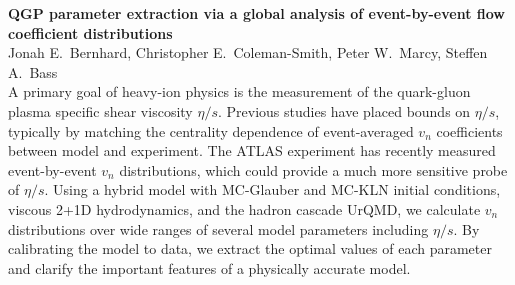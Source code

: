 \documentclass[letterpaper,10pt]{article}
\begin{document}
\textbf{QGP parameter extraction via a global analysis of event-by-event flow coefficient distributions} \\
Jonah E.\ Bernhard, Christopher E.\ Coleman-Smith, Peter W.\ Marcy, Steffen A.\ Bass \\


A primary goal of heavy-ion physics is the measurement of the quark-gluon plasma specific shear viscosity $\eta/s$.  Previous studies have placed bounds on $\eta/s$, typically by matching the centrality dependence of event-averaged $v_n$ coefficients between model and experiment.  The ATLAS experiment has recently measured event-by-event $v_n$ distributions, which could provide a much more sensitive probe of $\eta/s$.  Using a hybrid model with MC-Glauber and MC-KLN initial conditions, viscous 2+1D hydrodynamics, and the hadron cascade UrQMD, we calculate $v_n$ distributions over wide ranges of several model parameters including $\eta/s$.  By calibrating the model to data, we extract the optimal values of each parameter and clarify the important features of a physically accurate model.
\end{document}
